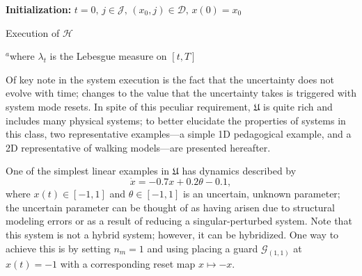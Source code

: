 \par
\begin{algorithm}[!t]
\small
 {\bf Initialization:} $t=0,\,j\in \mathcal J,\,(x_0,j)\in \mathcal D,\,x(0)=x_0$\;
 \While{1}{
 {\em Let} $\theta$ be drawn according to $\mu_{\theta_j}$\;
 {\em Let} $\gamma\colon [0,T]\rightarrow \mathrm{M}_j$, abs. ct. st.\\\hspace{.2in}
 $\dot \gamma(s)=\tilde f(\gamma(s),\theta)$ $\lambda_t^{\text{\tiny a}}$-a.e., $s\in [t,T]$\\\hspace{.2in}
 $\gamma(t)=x(t)$\;
 $\Lambda_{(j,t)}:=\{r\in [t,T]| \exists (j,k)\in \mathcal E \text{ st. } (\gamma(r),\theta)\in \mathcal G_{(j,k)}\}$\;
 \eIf {$\Lambda_{(j,t)}\ne \emptyset$}{%
    $t':=\min \Lambda_{(j,t)}$, $k$ st. $\gamma(t')\in \pi_{x}(\mathcal G_{(j,k)})$\\\hspace{.2in}
     $x(s)\leftarrow \gamma(s)$, $\forall s\in [t,t')$\\ \hspace{.2in}
    $t\leftarrow t',\,x(t')\leftarrow R_{(j,k)}(\gamma(t')),\,j\leftarrow k$
 }
 {
 $x(s)=\gamma(s),\,\forall s\in [t,T]$\;
 Stop\;
 }
 }
 \caption{Execution of $\mathcal H$}
 \label{alg:execution}
 $^a$where $\lambda_t$ is the Lebesgue measure on $[t,T]$
\end{algorithm}
Of key note in the system execution is the fact that the uncertainty does not evolve with time; changes to the value that the uncertainty takes is triggered with system mode resets. In spite of this peculiar requirement, $\mathfrak{U}$ is quite rich and includes many physical systems; to better elucidate the properties of systems in this class, two representative examples---a simple 1D pedagogical example, and a 2D representative of walking models---are presented hereafter.
\begin{example}
\label{example:1D}
One of the simplest linear examples in $\mathfrak{U}$ has dynamics described by
$$
	\dot x = -0.7x+0.2\theta-0.1,
$$
where \mbox{$x(t)\in [-1,1]$} and $\theta\in [-1,1]$ is an uncertain, unknown parameter; the uncertain parameter can be thought of as having arisen due to structural modeling errors or as a result of reducing a singular-perturbed system. Note that this system is not a hybrid system; however, it can be hybridized. One way to achieve this is by setting $n_m=1$ and using placing a guard $\mathcal G_{(1,1)}$ at $x(t)=-1$ with a corresponding reset map $x\mapsto -x$.
\end{example}
